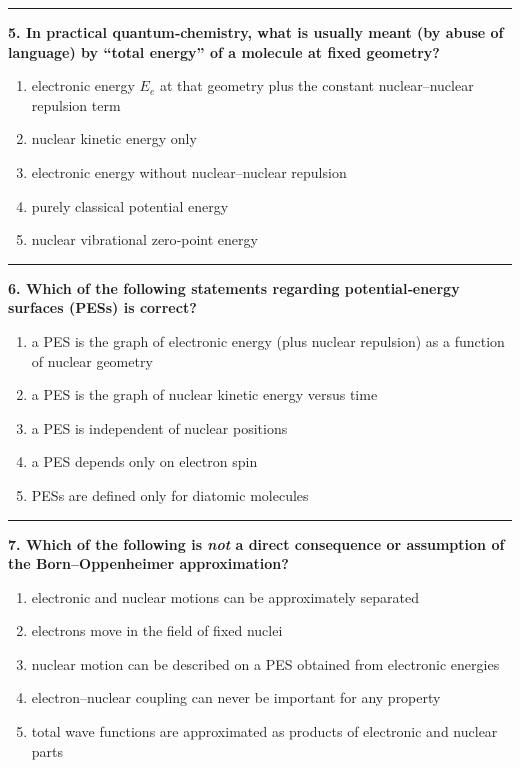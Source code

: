 \documentclass[
  english,
  9pt,
]{extbook}
\providecommand{\tightlist}{%
  \setlength{\itemsep}{0pt}\setlength{\parskip}{0pt}}
\theoremstyle{definition}
\theoremstyle{definition}
\theoremstyle{definition}
\theoremstyle{definition}
\theoremstyle{remark}
\begin{document}
\begin{center}\rule{0.5\linewidth}{0.5pt}\end{center}

\textbf{5. In practical quantum‑chemistry, what is usually meant (by abuse of language) by ``total energy'' of a molecule at fixed geometry?}

\begin{enumerate}
\def\labelenumi{\alph{enumi}.}
\tightlist
\item
  electronic energy \(E_e\) at that geometry plus the constant nuclear--nuclear repulsion term
\item
  nuclear kinetic energy only
\item
  electronic energy without nuclear--nuclear repulsion
\item
  purely classical potential energy
\item
  nuclear vibrational zero‑point energy
\end{enumerate}

\begin{center}\rule{0.5\linewidth}{0.5pt}\end{center}

\textbf{6. Which of the following statements regarding potential‑energy surfaces (PESs) is correct?}

\begin{enumerate}
\def\labelenumi{\alph{enumi}.}
\tightlist
\item
  a PES is the graph of electronic energy (plus nuclear repulsion) as a function of nuclear geometry
\item
  a PES is the graph of nuclear kinetic energy versus time
\item
  a PES is independent of nuclear positions
\item
  a PES depends only on electron spin
\item
  PESs are defined only for diatomic molecules
\end{enumerate}

\begin{center}\rule{0.5\linewidth}{0.5pt}\end{center}

\textbf{7. Which of the following is \emph{not} a direct consequence or assumption of the Born--Oppenheimer approximation?}

\begin{enumerate}
\def\labelenumi{\alph{enumi}.}
\tightlist
\item
  electronic and nuclear motions can be approximately separated
\item
  electrons move in the field of fixed nuclei
\item
  nuclear motion can be described on a PES obtained from electronic energies
\item
  electron--nuclear coupling can never be important for any property
\item
  total wave functions are approximated as products of electronic and nuclear parts
\end{enumerate}
\end{document}
